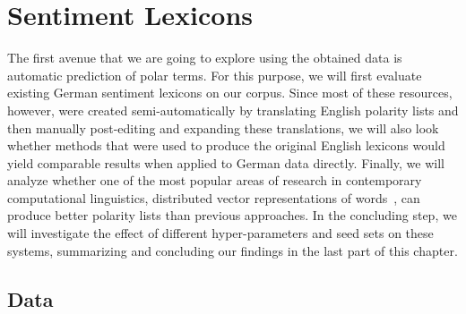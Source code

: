 

\chapter{Sentiment Lexicons}\label{chap:snt:lex}

The first avenue that we are going to explore using the obtained data
is automatic prediction of polar terms.
For this purpose, we will first evaluate existing German sentiment
lexicons on our corpus.  Since most of these resources, however, were
created semi-automatically by translating English polarity lists and
then manually post-editing and expanding these translations, we will
also look whether methods that were used to produce the original
English lexicons would yield comparable results when applied to German
data directly.  Finally, we will analyze whether one of the most
popular areas of research in contemporary computational linguistics,
distributed vector representations of words~\cite{Mikolov:13}, can
produce better polarity lists than previous approaches.  In the
concluding step, we will investigate the effect of different
hyper-parameters and seed sets on these systems, summarizing and
concluding our findings in the last part of this chapter.

\section{Data}\label{sec:snt-lex:data}

